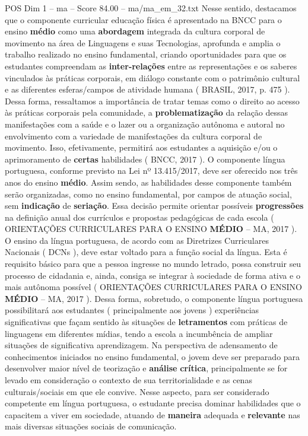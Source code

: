 \begin{textsample}{POS Dim 1 – ma – Score 84.00 – ma/ma\_em\_32.txt}
Nesse sentido, destacamos que o componente curricular educação física é apresentado na BNCC para o ensino \textbf{médio} como uma \textbf{abordagem} integrada da cultura corporal de movimento na área de Linguagens e suas Tecnologias, aprofunda e amplia o trabalho realizado no ensino fundamental, criando oportunidades para que os estudantes compreendam as \textbf{inter-relações} entre as representações e os saberes vinculados às práticas corporais, em diálogo constante com o patrimônio cultural e as diferentes esferas/campos de atividade humana ( BRASIL, 2017, p. 475 ).
Dessa forma, ressaltamos a importância de tratar temas como o direito ao acesso às práticas corporais pela comunidade, a \textbf{problematização} da relação dessas manifestações com a saúde e o lazer ou a organização autônoma e autoral no envolvimento com a variedade de manifestações da cultura corporal de movimento.
Isso, efetivamente, permitirá aos estudantes a aquisição e/ou o aprimoramento de \textbf{certas} habilidades ( BNCC, 2017 ).
O componente língua portuguesa, conforme previsto na Lei nº 13.415/2017, deve ser oferecido nos três anos do ensino \textbf{médio}.
Assim sendo, as habilidades desse componente também serão organizadas, como no ensino fundamental, por campos de atuação social, sem \textbf{indicação} de \textbf{seriação}.
Essa decisão permite orientar possíveis \textbf{progressões} na definição anual dos currículos e propostas pedagógicas de cada escola ( ORIENTAÇÕES CURRICULARES PARA O ENSINO \textbf{MÉDIO} – MA, 2017 ).
O ensino da língua portuguesa, de acordo com as Diretrizes Curriculares Nacionais ( DCNs ), deve estar voltado para a função social da língua.
Esta é requisito básico para que a pessoa ingresse no mundo letrado, possa construir seu processo de cidadania e, ainda, consiga se integrar à sociedade de forma ativa e o mais autônoma possível ( ORIENTAÇÕES CURRICULARES PARA O ENSINO \textbf{MÉDIO} – MA, 2017 ).
Dessa forma, sobretudo, o componente língua portuguesa possibilitará aos estudantes ( principalmente aos jovens ) experiências significativas que façam sentido às situações de \textbf{letramentos} com práticas de linguagens em diferentes mídias, tendo a escola a incumbência de ampliar situações de significativa aprendizagem.
Na perspectiva de adensamento de conhecimentos iniciados no ensino fundamental, o jovem deve ser preparado para desenvolver maior nível de teorização e \textbf{análise} \textbf{crítica}, principalmente se for levado em consideração o contexto de sua territorialidade e as cenas culturais/sociais em que ele convive.
Nesse aspecto, para ser considerado competente em língua portuguesa, o estudante precisa dominar habilidades que o capacitem a viver em sociedade, atuando de \textbf{maneira} adequada e \textbf{relevante} nas mais diversas situações sociais de comunicação.

\end{textsample}

